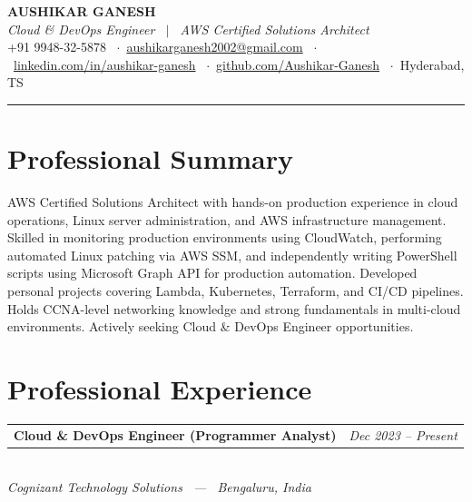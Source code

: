 \documentclass[10pt, a4paper]{article}
\makeatletter
\newcommand{\expentry}[3]{%
  \vspace{6pt}%
  \noindent
  \begin{tabularx}{\linewidth}{@{}X r@{}}
    \textbf{\color{darkgray}#1} & \textit{\color{lightgray}#3}
  \end{tabularx}\\[-2pt]
  \textit{\color{headblue}\small #2}%
  \vspace{3pt}%
}
\makeatother
\begin{document}

\begin{center}
  {\huge\bfseries\color{darkgray} AUSHIKAR GANESH}\\[4pt]
  {\normalsize\color{headblue}\textit{Cloud \& DevOps Engineer \ $|$ \ AWS Certified Solutions Architect}}\\[6pt]
  {\small\color{lightgray}
    +91 9948-32-5878
    \ $\cdot$\ 
    \href{mailto:aushikarganesh2002@gmail.com}{aushikarganesh2002@gmail.com}
    \ $\cdot$\ 
    \href{https://www.linkedin.com/in/aushikar-ganesh}{linkedin.com/in/aushikar-ganesh}
    \ $\cdot$\ 
    \href{https://github.com/Aushikar-Ganesh}{github.com/Aushikar-Ganesh}
    \ $\cdot$\ 
    Hyderabad, TS
  }
\end{center}

\vspace{1pt}
{\color{rulecol}\hrule}
\vspace{0pt}

\section{Professional Summary}

{\color{midgray}
AWS Certified Solutions Architect with hands-on production experience in cloud operations,
Linux server administration, and AWS infrastructure management. Skilled in monitoring
production environments using CloudWatch, performing automated Linux patching via AWS SSM,
and independently writing PowerShell scripts using Microsoft Graph API for production automation.
Developed personal projects covering Lambda, Kubernetes, Terraform, and CI/CD pipelines.
Holds CCNA-level networking knowledge and strong fundamentals in multi-cloud environments.
Actively seeking Cloud \& DevOps Engineer opportunities.
}

\section{Professional Experience}

\expentry%
  {Cloud \& DevOps Engineer (Programmer Analyst)}%
  {Cognizant Technology Solutions \ --- \ Bengaluru, India}%
  {Dec 2023 -- Present}
\end{document}
